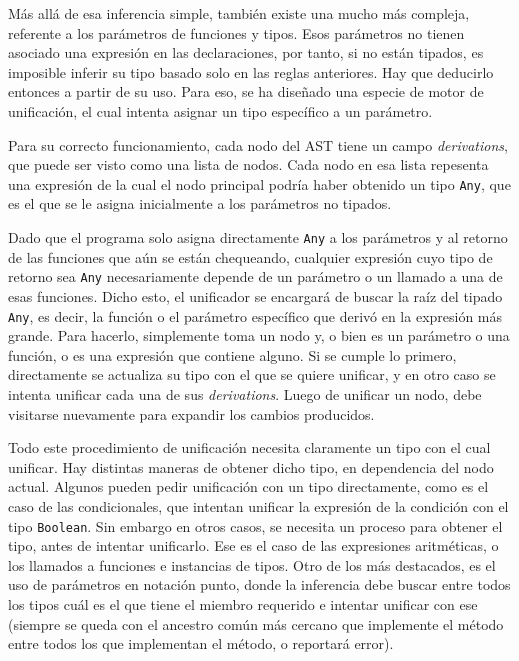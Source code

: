 \documentclass{llncs}
\begin{document}
Más allá de esa inferencia simple, también existe una mucho más compleja, referente a los parámetros de funciones y tipos. Esos parámetros no tienen asociado una expresión en las declaraciones, por tanto, si no están tipados, es imposible inferir su tipo basado solo en las reglas anteriores. Hay que deducirlo entonces 
a partir de su uso. Para eso, se ha diseñado una especie de motor de unificación, el cual intenta asignar un tipo específico a un parámetro. 

Para su correcto funcionamiento, cada nodo del AST tiene un campo \textit{derivations}, que puede ser visto como una lista de nodos. Cada nodo en esa lista repesenta una expresión de la cual el nodo principal podría haber obtenido un tipo \texttt{Any}, que es el que se le asigna inicialmente a los parámetros no tipados. 

Dado que el programa solo asigna directamente \texttt{Any} a los parámetros y al retorno de las funciones que aún se están chequeando, cualquier expresión cuyo tipo de retorno sea \texttt{Any} necesariamente depende de un parámetro o un llamado a una de esas funciones. Dicho esto, el unificador se encargará de buscar la raíz del tipado \texttt{Any}, es decir, la función o el parámetro específico que derivó en la expresión más grande.
Para hacerlo, simplemente toma un nodo y, o bien es un parámetro o una función, o es una expresión que contiene alguno. Si se cumple lo primero, directamente se actualiza su tipo con el que se quiere unificar, y en otro caso se intenta unificar cada una de sus \textit{derivations}. Luego de unificar 
un nodo, debe visitarse nuevamente para expandir los cambios producidos.

Todo este procedimiento de unificación necesita claramente un tipo con el cual unificar. Hay distintas maneras de obtener dicho tipo, en dependencia del nodo actual. Algunos pueden pedir unificación con un tipo directamente, como es el caso de las condicionales, que intentan unificar la expresión de la condición con el tipo \texttt{Boolean}. 
Sin embargo en otros casos, se necesita un proceso para obtener el tipo, antes de intentar unificarlo. Ese es el caso de las expresiones aritméticas, o los llamados a funciones e instancias de tipos. Otro de los más destacados, es el uso de parámetros en notación punto, donde la inferencia debe buscar entre todos los tipos cuál es 
el que tiene el miembro requerido e intentar unificar con ese (siempre se queda con el ancestro común más cercano que implemente el método entre todos los que implementan el método, o reportará error).
\end{document}
